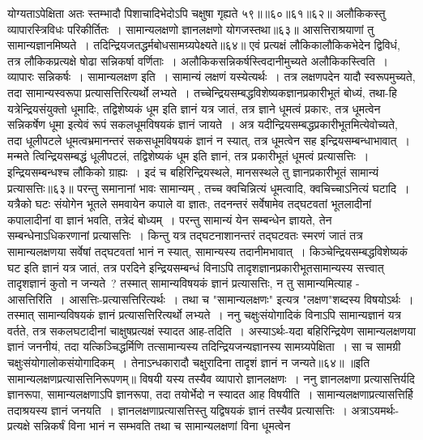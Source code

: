 योग्यताऽपेक्षिता अतः स्तम्भादौ पिशाचादिभेदोऽपि चक्षुषा गृह्यते ५९॥॥६०॥६१॥६२॥
अलौकिकस्तु व्यापारस्त्रिविधः परिकीर्तितः~।
सामान्यलक्षणो ज्ञानलक्षणो योगजस्तथा॥६३॥
आसत्तिराश्रयाणां तु सामान्यज्ञानमिष्यते~।
तदिन्द्रियजतद्धर्मबोधसामग्र्यपेक्ष्यते॥६४॥
एवं प्रत्यक्षं लौकिकालौकिकभेदेन द्विविधं, तत्र लौकिकप्रत्यक्षे षोढा सन्निकर्षा वर्णिताः~।
अलौकिकसन्निकर्षस्त्विदानीमुच्यते अलौकिकस्त्विति~। व्यापारः सन्निकर्षः~। सामान्यलक्षण इति~। सामान्यं लक्षणं यस्येत्यर्थः~। तत्र लक्षणपदेन यादौ स्वरूपमुच्यते,
तदा सामान्यस्वरूपा प्रत्यासत्तिरित्यर्थो लभ्यते~। तच्चेन्द्रियसम्बद्धविशेष्यकज्ञानप्रकारीभूतं बोध्यं, तथा-हि यत्रेन्द्रियसंयुक्तो धूमादिः, तद्विशेष्यकं धूम इति ज्ञानं यत्र जातं,
तत्र ज्ञाने धूमत्वं प्रकारः, तत्र धूमत्वेन सन्निकर्षेण धूमा इत्येवं रूपं सकलधूमविषयकं ज्ञानं जायते~। अत्र यदीन्द्रियसम्बद्धप्रकारीभूतमित्येवोच्यते, तदा धूलीपटले
धूमत्वभ्रमानन्तरं सकसधूमविषयकं ज्ञानं न स्यात्, तत्र धूमत्वेन सह इन्द्रियसम्बन्धाभावात्~। मन्मते त्विन्द्रियसम्बद्धं धूलीपटलं, तद्विशेष्यकं धूम इति ज्ञानं, तत्र प्रकारीभूतं
धूमत्वं प्रत्यासत्तिः~। इन्द्रियसम्बन्धश्च लौकिको ग्राह्यः~। इदं च बहिरिन्द्रियस्थले, मानसस्थले तु ज्ञानप्रकारीभूतं सामान्यं प्रत्यासत्तिः॥६३॥
परन्तु समानानां भावः सामान्यम् , तच्च क्वचिन्नित्यं धूमत्वादि, क्वचिच्चाऽनित्यं घटादि~। यत्रैको घटः संयोगेन भूतले समवायेन कपाले वा ज्ञातः, तदनन्तरं
सर्वेषामेव तद्घटवतां भूतलादीनां कपालादीनां वा ज्ञानं भवति, तत्रेदं बोध्यम्~। परन्तु सामान्यं येन सम्बन्धेन ज्ञायते, तेन सम्बन्धेनाऽधिकरणानां प्रत्यासत्तिः~। किन्तु यत्र
तद्घटनाशानन्तरं तद्घटवतः स्मरणं जातं तत्र सामान्यलक्षणया सर्वेषां तद्घटवतां भानं न स्यात्, सामान्यस्य तदानीमभावात्~। किञ्चेन्द्रियसम्बद्धविशेष्यकं घट इति
ज्ञानं यत्र जातं, तत्र परदिने इन्द्रियसम्बन्धं विनाऽपि तादृशज्ञानप्रकारीभूतसामान्यस्य सत्त्वात् तादृशज्ञानं कुतो न जन्यते~? तस्मात् सामान्यविषयकं ज्ञानं प्रत्यासत्तिः, न
तु सामान्यमित्याह - आसत्तिरिति~। आसत्तिः-प्रत्यासत्तिरित्यर्थः~। तथा च "सामान्यलक्षणः" इत्यत्र "लक्षण"शब्दस्य विषयोऽर्थः~। तस्मात् सामान्यविषयकं ज्ञानं प्रत्यासत्तिरित्यर्थो
लभ्यते~। ननु चक्षुःसंयोगादिकं विनाऽपि सामान्यज्ञानं यत्र वर्तते, तत्र सकलघटादीनां चाक्षुषप्रत्यक्षं स्यादत आह-तदिति~। अस्याऽर्थः-यदा बहिरिन्द्रियेण सामान्यलक्षणया
ज्ञानं जननीयं, तदा यत्किञ्चिद्धर्मिणि तत्सामान्यस्य तदिन्द्रियजन्यज्ञानस्य सामग्र्यपेक्षिता~। सा च सामग्री चक्षुःसंयोगालोकसंयोगादिकम्~। तेनाऽन्धकारादौ चक्षुरादिना
तादृशं ज्ञानं न जन्यते॥६४॥
॥इति सामान्यलक्षणप्रत्यासत्तिनिरूपणम्॥
विषयी यस्य तस्यैव व्यापारो ज्ञानलक्षणः~।
ननु ज्ञानलक्षणा प्रत्यासत्तिर्यदि ज्ञानरूपा, सामान्यलक्षणाऽपि ज्ञानरूपा, तदा तयोर्भेदो न स्यादत आह विषयीति~। सामान्यलक्षणाप्रत्यासत्तिर्हि तदाश्रयस्य ज्ञानं
जनयति~। ज्ञानलक्षणाप्रत्यासत्तिस्तु यद्विषयकं ज्ञानं तस्यैव प्रत्यासत्तिः~। अत्राऽयमर्थः-प्रत्यक्षे सन्निकर्षं विना भानं न सम्भवति तथा च सामान्यलक्षणां विना धूमत्वेन
